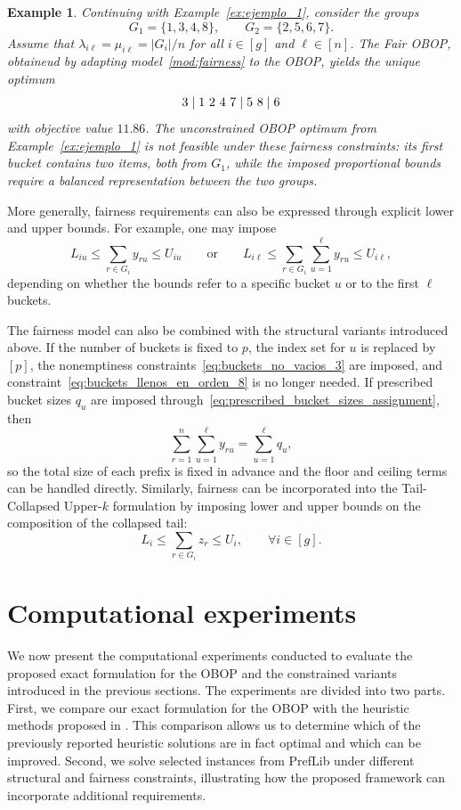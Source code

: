 \documentclass[pdflatex,basic,Numbered]{jnl}%
\theoremstyle{plain}
\newtheorem{example}{Example}
\theoremstyle{remark}
\theoremstyle{thmstyleone}%
\theoremstyle{thmstylethree}%
\begin{document}
\begin{example}\label{ex:ejemplo_8}
Continuing with Example~\ref{ex:ejemplo_1}, consider the groups
\[
G_1=\{1,3,4,8\},
\qquad
G_2=\{2,5,6,7\}.
\]
Assume that \(\lambda_{i\ell}=\mu_{i\ell}=|G_i|/n\) for all \(i\in[g]\) and \(\ell\in[n]\). The {\rm Fair OBOP}, obtaineud by adapting model~\eqref{mod:fairness} to the {\rm OBOP}, yields the unique optimum
\[
{\rm 3 \mid 1\ 2\ 4\ 7 \mid 5\ 8 \mid 6}
\]
with objective value \(11.86\). The unconstrained {\rm OBOP} optimum from Example~\ref{ex:ejemplo_1} is not feasible under these fairness constraints: its first bucket contains two items, both from \(G_1\), while the imposed proportional bounds require a balanced representation between the two groups.
\end{example}

More generally, fairness requirements can also be expressed through explicit lower and upper bounds. For example, one may impose
\[
L_{iu}\le \sum_{r\in G_i}y_{ru}\le U_{iu}
\qquad
\text{or}
\qquad
L_{i\ell}\le \sum_{r\in G_i}\sum_{u=1}^{\ell}y_{ru}\le U_{i\ell},
\]
depending on whether the bounds refer to a specific bucket \(u\) or to the first \(\ell\) buckets.

The fairness model can also be combined with the structural variants introduced above. If the number of buckets is fixed to \(p\), the index set for \(u\) is replaced by \([p]\), the nonemptiness constraints~\eqref{eq:buckets_no_vacios_3} are imposed, and constraint~\eqref{eq:buckets_llenos_en_orden_8} is no longer needed. If prescribed bucket sizes \(q_u\) are imposed through~\eqref{eq:prescribed_bucket_sizes_assignment}, then
\[
\sum_{r=1}^n\sum_{u=1}^{\ell}y_{ru}
=
\sum_{u=1}^{\ell}q_u,
\]
so the total size of each prefix is fixed in advance and the floor and ceiling terms can be handled directly. Similarly, fairness can be incorporated into the Tail-Collapsed Upper-\(k\) formulation by imposing lower and upper bounds on the composition of the collapsed tail:
\[
L_i\le \sum_{r\in G_i}z_r\le U_i,
\qquad \forall i\in[g].
\]

\section{Computational experiments} \label{sec:CE}

We now present the computational experiments conducted to evaluate the proposed exact formulation for the {\rm OBOP} and the constrained variants introduced in the previous sections. The experiments are divided into two parts. First, we compare our exact formulation for the {\rm OBOP} with the heuristic methods proposed in \cite{aledo2018approaching}. This comparison allows us to determine which of the previously reported heuristic solutions are in fact optimal and which can be improved. Second, we solve selected instances from PrefLib under different structural and fairness constraints, illustrating how the proposed framework can incorporate additional requirements.
\end{document}
